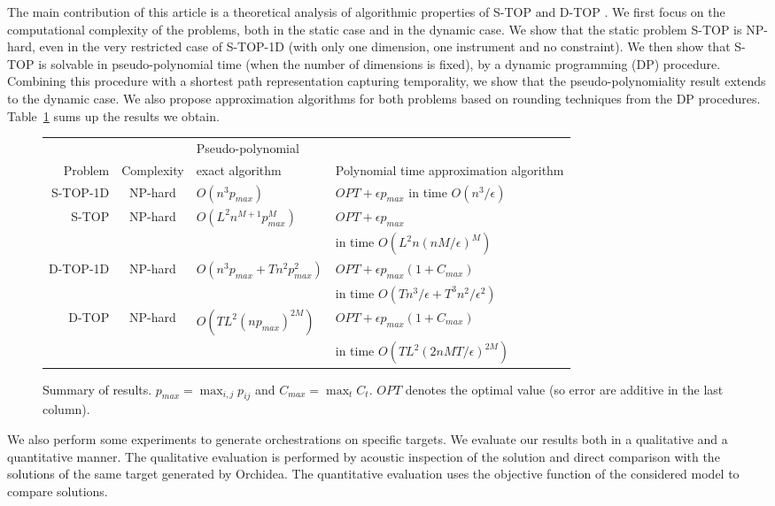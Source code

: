 \documentclass[a4paper]{book}
\newcommand{\stat}{{\sc S-TOP }}
\newcommand{\statoned}{{\sc S-TOP-1D }}
\newcommand{\dyn}{{\sc D-TOP }}
\newcommand{\dynoned}{{\sc D-TOP-1D }}
\begin{document}
The main contribution of this article is a theoretical analysis of algorithmic properties of \stat and \dyn. We first focus on the computational complexity of the problems, both in the static case and in the dynamic case. We show that the static problem \stat is NP-hard, even in the very restricted case of \statoned (with only one dimension, one instrument and no constraint). 
We then show that \stat is solvable in pseudo-polynomial time (when the number of dimensions is fixed), by a dynamic programming (DP) procedure. Combining this procedure with a shortest path representation capturing temporality, we show that the pseudo-polynomiality result extends to the dynamic case. We also propose approximation algorithms for both problems based on rounding techniques from the DP procedures. Table~\ref{table:results} sums up the results we obtain.
\begin{figure}
\begin{tabular}{r||c|l|l}
     &   & Pseudo-polynomial & \\
        Problem  & Complexity  & exact algorithm &  Polynomial time approximation algorithm\\
     \hline \hline
     \statoned &  NP-hard & $O(n^3p_{max})$ & $OPT+\epsilon p_{max}$ in time $O(n^3/\epsilon)$ \\ \hline
          \stat &  NP-hard & $O(L^2n^{M+1}p_{max}^M)$ & $OPT+\epsilon p_{max}$ \\ 
                     &   &  &  in time $O(L^2n(nM/\epsilon)^M)$ \\ \hline
               \dynoned &  NP-hard & $O(n^3p_{max}+Tn^2p_{max}^2)$ & $OPT+\epsilon p_{max}(1+C_{max})$  \\   &  &  &  in time $O(Tn^3/\epsilon+T^3n^2/\epsilon^2)$ \\
               \hline
     \dyn &  NP-hard & $O(TL^2(np_{max})^{2M})$ & $OPT+\epsilon p_{max}(1+C_{max})$ \\ 
           &   &  & in time $O(TL^2(2nMT/\epsilon)^{2M})$ \\ \hline
\end{tabular}
\caption{Summary of results. $p_{max}=\max_{i,j} p_{ij}$ and $C_{max}=\max_{t}C_t$. $OPT$ denotes the optimal value (so error are additive in the last column).}\label{table:results}
\end{figure}

We also perform some experiments to generate orchestrations on specific targets. We evaluate our results both in a qualitative and a quantitative manner. 
The qualitative evaluation is performed by acoustic inspection of the solution and direct comparison with the solutions of the same target generated by Orchidea. The quantitative evaluation uses the objective function of the considered model to compare solutions.
\end{document}
